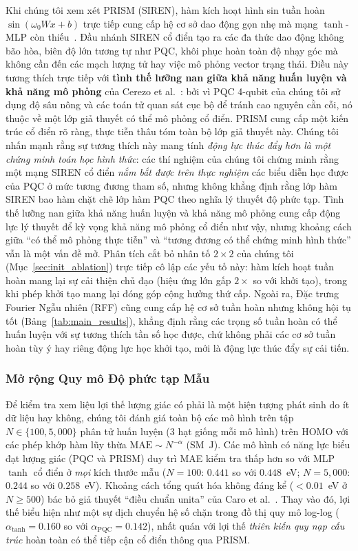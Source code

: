 \documentclass[10pt,twocolumn,letterpaper]{article}
\begin{document}
Khi chúng tôi xem xét PRISM (SIREN), hàm kích hoạt hình sin tuần hoàn $\sin(\omega_0 W x + b)$ trực tiếp cung cấp hệ cơ sở dao động gọn nhẹ mà mạng $\tanh$-MLP còn thiếu~\cite{sitzmann2020siren}.
Đầu nhánh SIREN cổ điển tạo ra các đa thức dao động không bão hòa, biên độ lớn tương tự như PQC, khôi phục hoàn toàn độ nhạy góc mà không cần đến các mạch lượng tử hay việc mô phỏng vector trạng thái.
Điều này tương thích trực tiếp với \textbf{tình thế lưỡng nan giữa khả năng huấn luyện và khả năng mô phỏng} của Cerezo et al.~\cite{Cerezo:2023nqf}: bởi vì PQC 4-qubit của chúng tôi sử dụng độ sâu nông và các toán tử quan sát cục bộ để tránh cao nguyên cằn cỗi, nó thuộc về một lớp giả thuyết có thể mô phỏng cổ điển.
PRISM cung cấp một kiến trúc cổ điển rõ ràng, thực tiễn thâu tóm toàn bộ lớp giả thuyết này.
Chúng tôi nhấn mạnh rằng sự tương thích này mang tính \textit{động lực thúc đẩy hơn là một chứng minh toán học hình thức}: các thí nghiệm của chúng tôi chứng minh rằng một mạng SIREN cổ điển \textit{nắm bắt được trên thực nghiệm} các biểu diễn học được của PQC ở mức tương đương tham số, nhưng không khẳng định rằng lớp hàm SIREN bao hàm chặt chẽ lớp hàm PQC theo nghĩa lý thuyết độ phức tạp. Tình thế lưỡng nan giữa khả năng huấn luyện và khả năng mô phỏng cung cấp động lực lý thuyết để kỳ vọng khả năng mô phỏng cổ điển như vậy, nhưng khoảng cách giữa ``có thể mô phỏng thực tiễn'' và ``tương đương có thể chứng minh hình thức'' vẫn là một vấn đề mở.
Phân tích cắt bỏ nhân tố $2 \times 2$ của chúng tôi (Mục~\ref{sec:init_ablation}) trực tiếp cô lập các yếu tố này: hàm kích hoạt tuần hoàn mang lại sự cải thiện chủ đạo (hiệu ứng lớn gấp $2\times$ so với khởi tạo), trong khi phép khởi tạo mang lại đóng góp cộng hưởng thứ cấp. Ngoài ra, Đặc trưng Fourier Ngẫu nhiên (RFF) cũng cung cấp hệ cơ sở tuần hoàn nhưng không hội tụ tốt (Bảng~\ref{tab:main_results}), khẳng định rằng các trọng số tuần hoàn có thể huấn luyện với sự tương thích tần số học được, chứ không phải các cơ sở tuần hoàn tùy ý hay riêng động lực học khởi tạo, mới là động lực thúc đẩy sự cải tiến.

\subsubsection{Mở rộng Quy mô Độ phức tạp Mẫu}

Để kiểm tra xem liệu lợi thế lượng giác có phải là một hiện tượng phát sinh do ít dữ liệu hay không, chúng tôi đánh giá toàn bộ các mô hình trên tập $N \in \{100, 5{,}000\}$ phân tử huấn luyện (3 hạt giống mỗi mô hình) trên HOMO với các phép khớp hàm lũy thừa $\text{MAE} \sim N^{-\alpha}$ (SM~J). Các mô hình có năng lực biểu đạt lượng giác (PQC và PRISM) duy trì MAE kiểm tra thấp hơn so với MLP $\tanh$ cổ điển ở \textit{mọi} kích thước mẫu ($N = 100$: $0.441$ so với $0.448$~eV; $N = 5{,}000$: $0.244$ so với $0.258$~eV). Khoảng cách tổng quát hóa không đáng kể ($< 0.01$~eV ở $N \ge 500$) bác bỏ giả thuyết ``điều chuẩn unita'' của Caro et al.~\cite{Caro:2021mgf}. Thay vào đó, lợi thế biểu hiện như một sự dịch chuyển hệ số chặn trong đồ thị quy mô log-log ($\alpha_{\tanh} = 0.160$ so với $\alpha_{\mathrm{PQC}} = 0.142$), nhất quán với lợi thế \textit{thiên kiến quy nạp cấu trúc} hoàn toàn có thể tiếp cận cổ điển thông qua PRISM.
\end{document}

